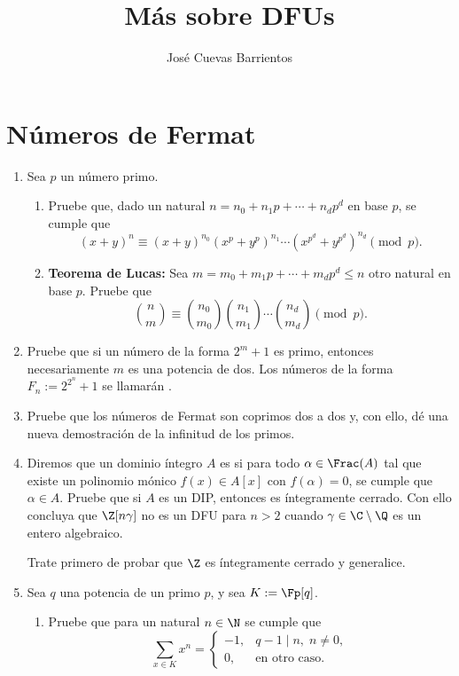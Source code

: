 \documentclass[11pt, reqno]{amsart}
\title{Más sobre DFUs}
\date{\DTMdate{2025-08-22}}
\author[José Cuevas]{José Cuevas Barrientos}
\begin{document}
\maketitle

\section{Números de Fermat}
\begin{enumerate}
	\item Sea $p$ un número primo.
		\begin{enumerate}
			\item Pruebe que, dado un natural $n = n_0 + n_1p + \cdots + n_dp^d$ en base $p$, se cumple que
				\[
					(x + y)^n \equiv (x + y)^{n_0}(x^p + y^p)^{n_1} \cdots \left( x^{p^d} + y^{p^d} \right)^{n_d} \pmod p.
				\]

			\item \textbf{Teorema de Lucas:}
				Sea $m = m_0 + m_1p + \cdots + m_dp^d \le n$ otro natural en base $p$.
				Pruebe que
				\[
					\binom{n}{m} \equiv \binom{n_0}{m_0} \binom{n_1}{m_1} \cdots \binom{n_d}{m_d} \pmod p.
				\]
		\end{enumerate}

	\item Pruebe que si un número de la forma $2^m + 1$ es primo, entonces necesariamente $m$ es una potencia de dos.
		Los números de la forma $F_n := 2^{2^n} + 1$ se llamarán .

	\item\lookright
		Pruebe que los números de Fermat son coprimos dos a dos y, con ello, dé una nueva demostración de la infinitud de los primos.

	\item Diremos que un dominio íntegro $A$ es  si para todo $\alpha \in \Frac(A)$ tal que existe un
		polinomio mónico $f(x) \in A[x]$ con $f(\alpha) = 0$, se cumple que $\alpha \in A$.
		Pruebe que si $A$ es un DIP, entonces es íntegramente cerrado.
		Con ello concluya que $\Z[n \gamma]$ no es un DFU para $n > 2$ cuando $\gamma \in \C \setminus \Q$ es un entero algebraico.

		\begin{hint}
			Trate primero de probar que $\Z$ es íntegramente cerrado y generalice.
		\end{hint}

	\item Sea $q$ una potencia de un primo $p$, y sea $K := \Fp[q]$.
		\begin{enumerate}
			\item Pruebe que para un natural $n \in \N$ se cumple que
				\[
					\sum_{x \in K} x^n =
					\begin{cases}
						-1, & q-1\mid n, \; n \ne 0, \\
						0, & \text{en otro caso.}
					\end{cases}
				\]


\end{enumerate}
\end{enumerate}
\end{document}
